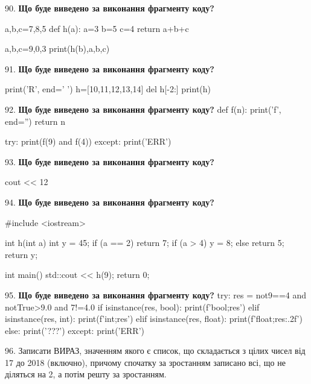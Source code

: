 \documentclass[11pt]{article}
\begin{document}
90. \textbf{Що буде виведено за виконання фрагменту коду?}

a,b,c=7,8,5
def h(a):
    a=3
    b=5
    c=4
    return a+b+c

a,b,c=9,0,3
print(h(b),a,b,c)
\par\vspace{5mm}

91. \textbf{Що буде виведено за виконання фрагменту коду?}

print('R', end=' ')
h=[10,11,12,13,14]
del h[-2:]
print(h)

\par\vspace{5mm}

92. \textbf{Що буде виведено за виконання фрагменту коду?}
def f(n):
    print('f', end='')
    return n

try:
    print(f(9) and f(4))
except:
    print('ERR')
\par\vspace{5mm}

93. \textbf{Що буде виведено за виконання фрагменту коду?}

cout << 12 %
\par\vspace{5mm}

94. \textbf{Що буде виведено за виконання фрагменту коду?}

#include <iostream>

int h(int a){
    int y = 45;
    if (a == 2) 
        return 7;
    if (a > 4)
         y = 8;
    else
         return 5;
    return y;
}

int main(){
    std::cout << h(9);
    return 0;
}

\par\vspace{5mm}

95. \textbf{Що буде виведено за виконання фрагменту коду?}
try:
    res = not9==4 and notTrue>9.0 and 7!=4.0
    if isinstance(res, bool):
        print(f'bool;{res}')
    elif isinstance(res, int):
        print(f'int;{res}')
    elif isinstance(res, float):
        print(f'float;{res:.2f}')
    else:
        print('???')
except:
    print('ERR')
\par\vspace{5mm}

96. 
Записати ВИРАЗ, значенням якого є список, що складається з цілих чисел від 17 до 2018 (включно), причому спочатку за зростанням записано всі, що не діляться на 2, а потім решту за зростанням.\par\vspace{5mm}
\end{document}
